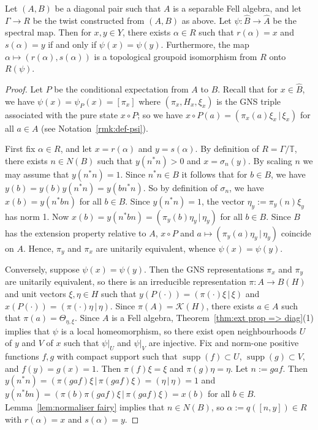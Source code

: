 \documentclass[12pt,a4paper]{amsart}
\newcommand{\field}[1]{\mathbb{#1}}
\newcommand{\TT}{\field{T}}
\newcommand{\Kk}{\mathcal{K}}
\newcommand{\supp}{\operatorname{supp}}
\newcommand{\Hh}{{H}}
\begin{document}
\begin{prop}\label{thm-equivalencerelationoftwist}
Let $(A,B)$ be a diagonal pair such that $A$ is a separable
Fell algebra, and let $\Gamma \to R$ be the twist constructed
from $(A,B)$ as above. Let $\psi : \widehat{B} \to \widehat{A}$
be the spectral map. Then for $x,y \in Y$, there exists $\alpha
\in R$ such that $r(\alpha) = x$ and $s(\alpha) = y$ if and
only if $\psi(x) = \psi(y)$. Furthermore, the map $\alpha
\mapsto (r(\alpha), s(\alpha))$ is a topological groupoid
isomorphism from $R$ onto $R(\psi)$.
%
\end{prop}

\begin{proof}
Let $P$ be the conditional expectation from $A$ to $B$.
Recall that for $x \in \widehat{B}$, we have $\psi(x) =
\psi_P(x) = [\pi_x]$ where  $(\pi_x, \Hh_x, \xi_x)$ is the GNS
triple associated with the pure state $x\circ P$; so we have
$x\circ P(a)=(\pi_x(a)\xi_x\,|\,\xi_x)$ for all $a\in A$ (see
Notation~\ref{rmk:def-psi}).

First fix $\alpha \in R$, and let $x = r(\alpha)$ and $y =
s(\alpha)$. By definition of $R = \Gamma/\TT$, there exists
$n\in N(B)$ such that $y(n^*n) > 0$ and $x = \sigma_n(y)$.  By
scaling $n$ we may assume that $y(n^*n) = 1$. Since $n^*n \in B$
it follows that for $b \in B$, we have $y(b) = y(b)y(n^*n) = y(b
n^*n)$. So by definition of $\sigma_n$, we have $x(b) =
y(n^*bn)$ for all $b \in B$. Since $y(n^*n) = 1$, the vector
$\eta_y := \pi_y(n)\xi_y$ has norm 1. Now
$x(b)=y(n^*bn)=(\pi_y(b)\eta_y\, |\, \eta_y)$ for all $b\in B$.
Since $B$ has the extension property relative to $A$, $x\circ P$
and $a\mapsto (\pi_y(a)\eta_y\, |\, \eta_y)$ coincide on $A$.
Hence, $\pi_y$ and $\pi_x$ are unitarily equivalent, whence
$\psi(x) = \psi(y)$.

Conversely, suppose $\psi(x) = \psi(y)$.  Then the GNS
representations %
$\pi_x$ and $\pi_y$  are unitarily equivalent, so there is an
irreducible representation $\pi : A \to B(\Hh)$ and unit vectors
$\xi, \eta \in \Hh$ such that $y(P(\cdot)) = ( \pi(\cdot)\xi
\,|\, \xi )$ and $x(P(\cdot)) = ( \pi(\cdot)\eta \,|\, \eta )$.
Since $\pi(A) = \Kk(\Hh)$, there exists $a \in A$ such that
$\pi(a) = \Theta_{\eta, \xi}$. Since $A$ is a Fell algebra,
Theorem~\ref{thm:ext prop => diag}(1) implies that $\psi$ is a
local homeomorphism, so there exist open neighbourhoods $U$ of
$y$ and $V$ of $x$ such that $\psi|_U$ and $\psi|_V$ are
injective. Fix and norm-one positive functions $f,g$ with compact
support such that $\supp(f) \subset U$, $\supp(g) \subset V$,
and $f(y) = g(x) = 1$. Then $\pi(f)\xi=\xi$ and
$\pi(g)\eta=\eta$. Let $n := gaf$. Then
$y(n^*n)=(\pi(gaf)\xi\,|\,\pi(gaf)\xi)=(\eta\,|\,\eta)=1$ and
$y(n^*bn)=(\pi(b)\pi(gaf)\xi\,|\,\pi(gaf)\xi)=x(b)$ for all
$b\in B$. Lemma~\ref{lem:normaliser fairy} implies that $n \in
N(B)$, so $\alpha := q([n,y]) \in R$ with $r(\alpha) = x$ and
$s(\alpha) = y$.


\end{proof}
\end{document}
